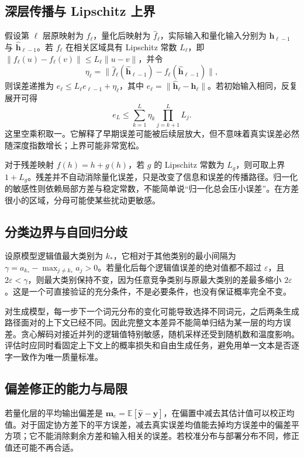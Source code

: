 \documentclass[UTF8,12pt,a4paper,fontset=fandol]{ctexart}
\begin{document}
\subsection{深层传播与 Lipschitz 上界}
假设第 $\ell$ 层原映射为 $f_\ell$，量化后映射为 $\widehat f_\ell$，实际输入和量化输入分别为 $\mathbf h_{\ell-1}$ 与 $\widehat{\mathbf h}_{\ell-1}$。若 $f_\ell$ 在相关区域具有 Lipschitz 常数 $L_\ell$，即 $\|f_\ell(u)-f_\ell(v)\|\leq L_\ell\|u-v\|$，并令
\[
 \eta_\ell=\|\widehat f_\ell(\widehat{\mathbf h}_{\ell-1})
 -f_\ell(\widehat{\mathbf h}_{\ell-1})\|,
\]
则误差递推为 $e_\ell\leq L_\ell e_{\ell-1}+\eta_\ell$，其中 $e_\ell=\|\widehat{\mathbf h}_\ell-\mathbf h_\ell\|$。若初始输入相同，反复展开可得
\begin{equation}
 e_L\leq\sum_{k=1}^L\eta_k\prod_{j=k+1}^L L_j.
 \label{eq:quant-deep-bound}
\end{equation}
这里空乘积取一。它解释了早期误差可能被后续层放大，但不意味着真实误差必然随深度指数增长；上界可能非常宽松。

对于残差映射 $f(h)=h+g(h)$，若 $g$ 的 Lipschitz 常数为 $L_g$，则可取上界 $1+L_g$。残差并不自动消除量化误差，只是改变了信息和误差的传播路径。归一化的敏感性则依赖局部方差与稳定常数，不能简单说“归一化总会压小误差”。在方差很小的区域，分母可能使某些扰动更敏感。

\subsection{分类边界与自回归分歧}
设原模型逻辑值最大类别为 $k_*$，它相对于其他类别的最小间隔为 $\gamma=a_{k_*}-\max_{j\ne k_*}a_j>0$。若量化后每个逻辑值误差的绝对值都不超过 $\varepsilon$，且 $2\varepsilon<\gamma$，则最大类别保持不变，因为任意竞争类别与原最大类别的差最多缩小 $2\varepsilon$。这是一个可直接验证的充分条件，不是必要条件，也没有保证概率完全不变。

对生成模型，每一步下一个词元分布的变化可能导致选择不同词元，之后两条生成路径面对的上下文已经不同。因此完整文本差异不能简单归结为某一层的均方误差。贪心解码对接近并列的逻辑值特别敏感，随机采样还受到随机数和温度影响。评估时应同时看固定上下文上的概率损失和自由生成任务，避免用单一文本是否逐字一致作为唯一质量标准。

\subsection{偏差修正的能力与局限}
若量化层的平均输出偏差是 $\mathbf m_e=\mathbb E[\widehat{\mathbf y}-\mathbf y]$，在偏置中减去其估计值可以校正均值。对于固定协方差下的平方误差，减去真实误差均值能去掉均方误差中的偏差平方项；它不能消除剩余方差和输入相关的误差。若校准分布与部署分布不同，修正值还可能不再合适。
\end{document}
